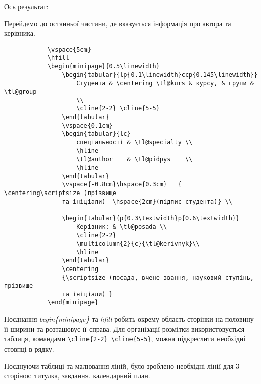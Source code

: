 Ось результат:


Перейдемо до останньої частини, де вказується інформація про автора та керівника. 

\begin{lstlisting}
			\vspace{5cm}
			\hfill
			\begin{minipage}{0.5\linewidth}
				\begin{tabular}{lp{0.1\linewidth}ccp{0.145\linewidth}}
					Студента & \centering \tl@kurs & курсу, & групи & \tl@group
					\\
					\cline{2-2} \cline{5-5}
				\end{tabular}
				\vspace{0.1cm}
				\begin{tabular}{lc}
					спеціальності & \tl@specialty \\
					\hline
					\tl@author    & \tl@pidpys    \\
					\hline
				\end{tabular}
				\vspace{-0.8cm}\hspace{0.3cm}	{ \centering\scriptsize (прізвище 
				та ініціали)  \hspace{2cm}(підпис студента)} \\
				
				\begin{tabular}{p{0.3\textwidth}p{0.6\textwidth}}
					Керівник: & \tl@posada \\
					\cline{2-2}
					\multicolumn{2}{c}{\tl@kerivnyk}\\
					\hline
				\end{tabular}
				\centering
				{\scriptsize (посада, вчене звання, науковий ступінь, прізвище
				та ініціали) }
			\end{minipage}
\end{lstlisting}



Поєднання \textit{begin\{minipage\}} та \textit{hfill} робить окрему область сторінки на половину її ширини та розташовує її справа. Для організації розмітки використовується таблиця, командами \verb|\cline{2-2} \cline{5-5}|, можна підкреслити необхідні стовпці в рядку.

Поєднуючи таблиці та малювання ліній, було зроблено необхідні лінії для 3 сторінок: титулка, завдання. календарний план.

